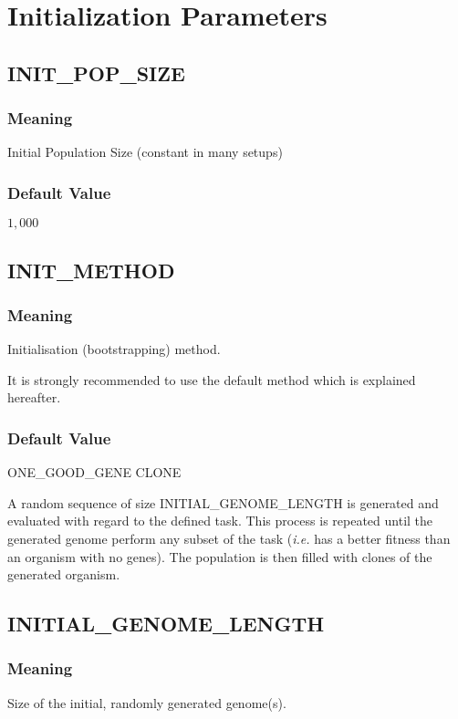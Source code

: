 \label{app:params}



\section{Initialization Parameters}

\subsection{INIT\_POP\_SIZE}
\subsubsection{Meaning}
Initial Population Size (constant in many setups)
\subsubsection{Default Value}
$1,000$

\subsection{INIT\_METHOD}
\subsubsection{Meaning}
Initialisation (bootstrapping) method.

It is strongly recommended to use the default method which is explained hereafter.
\subsubsection{Default Value}
ONE\_GOOD\_GENE CLONE

A random sequence of size INITIAL\_GENOME\_LENGTH is generated and evaluated with regard to the defined task.
This process is repeated until the generated genome perform any subset of the task (\emph{i.e.} has a better fitness than an organism with no genes).
The population is then filled with clones of the generated organism.

\subsection{INITIAL\_GENOME\_LENGTH}
\subsubsection{Meaning}
Size of the initial, randomly generated genome(s).
